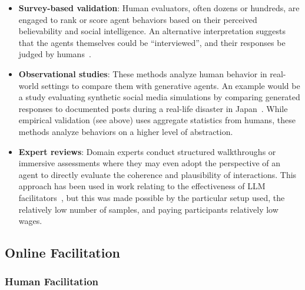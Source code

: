 \begin{itemize}[nosep, noitemsep]
	\item \textbf{Survey-based validation}: Human evaluators, often dozens or hundreds, are engaged to rank or score agent behaviors based on their perceived believability and social intelligence.  An alternative interpretation suggests that the agents themselves could be ``interviewed'', and their responses be judged by humans~\cite{adornetto2025_gabms}.
	
	\item \textbf{Observational studies}: These methods analyze human behavior in real-world settings to compare them with generative agents. An example would be a study evaluating synthetic social media simulations by comparing generated responses to documented posts during a real-life disaster in Japan~\cite{gao2025_s3}. While empirical validation (see above) uses aggregate statistics from humans, these methods analyze behaviors on a higher level of abstraction.
	
	\item \textbf{Expert reviews}: Domain experts conduct structured walkthroughs or immersive assessments where they may even adopt the perspective of an agent to directly evaluate the coherence and plausibility of interactions. This approach has been used in work relating to the effectiveness of LLM facilitators~\cite{cho-etal-2024-language}, but this was made possible by the particular setup used, the relatively low number of samples, and paying participants relatively low wages.
\end{itemize}


\subsection{Online Facilitation}
\label{sec:related:facilitation}

\subsubsection{Human Facilitation}

